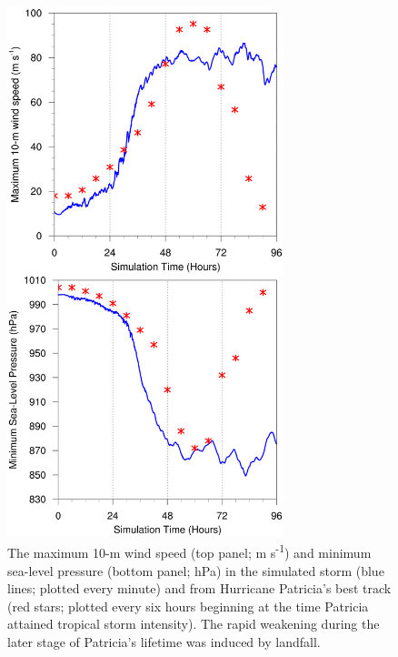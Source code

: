 \documentclass{ametsoc}
\begin{document}
%


\begin{figure}[ht]
\centerline{\includegraphics[width=19pc]{figures/vmax+pmin.png}}
\caption{The maximum 10-m wind speed (top panel; m s\textsuperscript{-1}) and minimum sea-level pressure (bottom panel; hPa) in the simulated storm (blue lines; plotted every minute) and from Hurricane Patricia's best track (red stars; plotted every six hours beginning at the time Patricia attained tropical storm intensity). The rapid weakening during the later stage of Patricia's lifetime was induced by landfall.}
\label{fig:vmax+pmin}
\end{figure}
\end{document}
